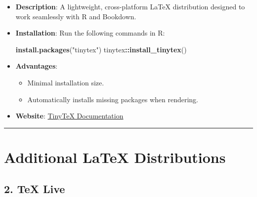 \documentclass[
]{book}
\newenvironment{Shaded}{\begin{snugshade}}{\end{snugshade}}
\newcommand{\FunctionTok}[1]{\textcolor[rgb]{0.13,0.29,0.53}{\textbf{#1}}}
\newcommand{\NormalTok}[1]{#1}
\newcommand{\SpecialCharTok}[1]{\textcolor[rgb]{0.81,0.36,0.00}{\textbf{#1}}}
\newcommand{\StringTok}[1]{\textcolor[rgb]{0.31,0.60,0.02}{#1}}
\providecommand{\tightlist}{%
  \setlength{\itemsep}{0pt}\setlength{\parskip}{0pt}}
\theoremstyle{definition}
\theoremstyle{definition}
\theoremstyle{definition}
\theoremstyle{definition}
\theoremstyle{remark}
\begin{document}
\begin{itemize}
\item
  \textbf{Description}: A lightweight, cross-platform LaTeX distribution designed to work seamlessly with R and Bookdown.
\item
  \textbf{Installation}: Run the following commands in R:

\begin{Shaded}
\begin{Highlighting}[]
\FunctionTok{install.packages}\NormalTok{(}\StringTok{"tinytex"}\NormalTok{)}
\NormalTok{tinytex}\SpecialCharTok{::}\FunctionTok{install\_tinytex}\NormalTok{()}
\end{Highlighting}
\end{Shaded}
\item
  \textbf{Advantages}:

  \begin{itemize}
  \tightlist
  \item
    Minimal installation size.
  \item
    Automatically installs missing packages when rendering.
  \end{itemize}
\item
  \textbf{Website}: \href{https://yihui.org/tinytex/}{TinyTeX Documentation}
\end{itemize}

\begin{center}\rule{0.5\linewidth}{0.5pt}\end{center}

\section{Additional LaTeX Distributions}\label{additional-latex-distributions}

\subsection{\texorpdfstring{2. \textbf{TeX Live}}{2. TeX Live}}\label{tex-live}
\end{document}
